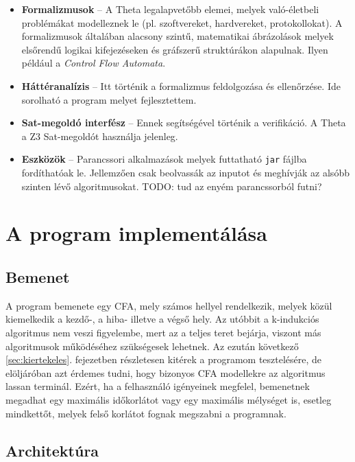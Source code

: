 \begin{itemize}
	\item \textbf{Formalizmusok} -- A Theta legalapvetőbb elemei, melyek való-életbeli problémákat modelleznek le (pl. szoftvereket, hardvereket, protokollokat). A formalizmusok általában alacsony szintű, matematikai ábrázolások melyek elsőrendű logikai kifejezéseken és gráfszerű struktúrákon alapulnak. Ilyen például a \emph{Control Flow Automata}.
	
	\item \textbf{Háttéranalízis} -- Itt történik a formalizmus feldolgozása és ellenőrzése. Ide sorolható a program melyet fejlesztettem.
	
	\item \textbf{Sat-megoldó interfész} -- Ennek segítségével történik a verifikáció. A Theta a Z3 Sat-megoldót használja jelenleg.
	
	\item \textbf{Eszközök} -- Parancssori alkalmazások melyek futtatható \verb+jar+ fájlba fordíthatóak le. Jellemzően csak beolvassák az inputot és meghívják az alsóbb szinten lévő algoritmusokat. TODO: tud az enyém parancssorból futni?
	
\end{itemize}

\section{A program implementálása}

\subsection{Bemenet}
A program bemenete egy CFA, mely számos hellyel rendelkezik, melyek közül kiemelkedik a kezdő-, a hiba- illetve a végső hely. Az utóbbit a k-indukciós algoritmus nem veszi figyelembe, mert az a teljes teret bejárja, viszont más algoritmusok működéséhez szükségesek lehetnek. Az ezután következő \ref{sec:kiertekeles}. fejezetben részletesen kitérek a programom tesztelésére, de elöljáróban azt érdemes tudni, hogy bizonyos CFA modellekre az algoritmus  lassan terminál. Ezért, ha a felhasználó igényeinek megfelel, bemenetnek megadhat egy maximális időkorlátot vagy egy maximális mélységet is, esetleg mindkettőt, melyek felső korlátot fognak megszabni a programnak.

\subsection{Architektúra}


